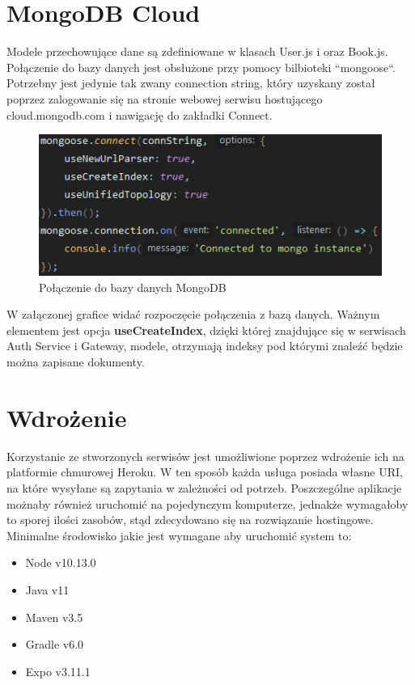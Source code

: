 
\section{MongoDB Cloud}
 
Modele przechowujące dane są zdefiniowane w klasach User.js i
oraz Book.js. Połączenie do bazy danych jest obsłużone przy pomocy bilbioteki ``mongoose``. Potrzebny jest jedynie tak zwany connection string, który uzyskany został poprzez zalogowanie się na stronie webowej serwisu hostującego cloud.mongodb.com i nawigację do zakładki Connect.\\
\begin{figure}[H]
	\centering
	\includegraphics[width=\linewidth]{mongo.png}
	\caption{Połączenie do bazy danych MongoDB}
\end{figure}
W załączonej grafice widać rozpoczęcie połączenia z bazą danych. Ważnym elementem jest opcja \textbf{useCreateIndex}, dzięki której znajdujące się w serwisach Auth Service i Gateway, modele, otrzymają indeksy pod którymi znaleźć będzie można zapisane dokumenty. 


\section{Wdrożenie}

Korzystanie ze stworzonych serwisów jest umożliwione poprzez wdrożenie ich na platformie chmurowej Heroku.
W ten sposób każda usługa posiada własne URI, na które wysyłane są zapytania w zależności od potrzeb.
Poszczególne aplikacje możnaby również uruchomić na pojedynczym komputerze, jednakże wymagałoby to sporej ilości zasobów, stąd zdecydowano się na rozwiązanie hostingowe.\\

Minimalne środowisko jakie jest wymagane aby uruchomić system to:
\begin{itemize}
	\item Node v10.13.0
	\item Java v11
	\item Maven v3.5
	\item Gradle v6.0
	\item Expo v3.11.1
\end{itemize}

